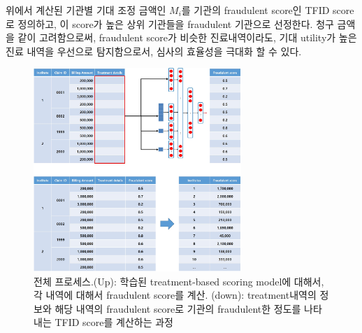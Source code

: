 \documentclass[11pt]{article}           %
\begin{document}
\vspace{5mm}
\noindent{}

\vspace{5mm}

위에서 계산된 기관별 기대 조정 금액인 $M_i$를 기관의 fraudulent score인 TFID score로 정의하고, 이 score가 높은 상위 기관들을 fraudulent 기관으로 선정한다.
청구 금액을 같이 고려함으로써, fraudulent score가 비슷한 진료내역이라도, 기대 utility가 높은 진료 내역을 우선으로 탐지함으로서, 심사의 효율성을 극대화 할 수 있다.

\begin{figure}[h]
   \centering
   \vspace{0.5cm}
   \includegraphics[width=0.7\textwidth]{[figure4]TFID_score_process.jpg}
   \vspace{-0.5cm}
   \caption{전체 프로세스.(Up): 학습된 treatment-based scoring model에 대해서, 각 내역에 대해서 fraudulent score를 계산. (down): treatment내역의 정보와 해당 내역의 fraudulent score로 기관의 fraudulent한 정도를 나타내는 TFID score를 계산하는 과정}
   \vspace{0.5cm}
   \label{fig:whole process}
\end{figure}
\end{document}
